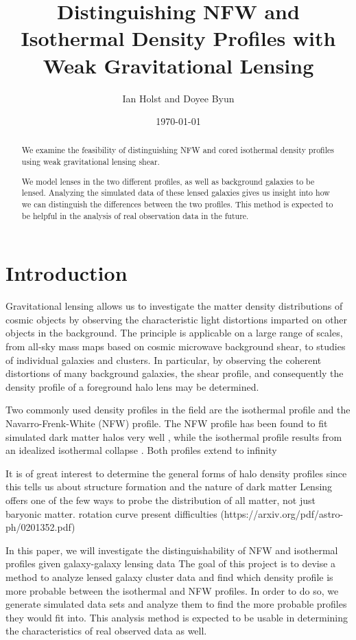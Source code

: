 \documentclass[10pt]{article}
\begin{document}
\title{Distinguishing NFW and Isothermal Density Profiles with Weak Gravitational Lensing}
\author{Ian Holst and Doyee Byun}
\date{\today}
\maketitle

\begin{abstract}
We examine the feasibility of distinguishing NFW and cored isothermal density profiles using weak gravitational lensing shear.

We model lenses in the two different profiles, as well as background galaxies to be lensed.
Analyzing the simulated data of these lensed galaxies gives us insight into how we can distinguish the differences between the two profiles.
This method is expected to be helpful in the analysis of real observation data in the future.
\end{abstract}


\section{Introduction}
Gravitational lensing allows us to investigate the matter density distributions of cosmic objects by observing the characteristic light distortions imparted on other objects in the background. The principle is applicable on a large range of scales, from all-sky mass maps based on cosmic microwave background shear, to studies of individual galaxies and clusters. In particular, by observing the coherent distortions of many background galaxies, the shear profile, and consequently the density profile of a foreground halo lens may be determined.

Two commonly used density profiles in the field are the isothermal profile and the Navarro-Frenk-White (NFW) profile. The NFW profile has been found to fit simulated dark matter halos very well \citep{}, while the isothermal profile results from an idealized isothermal collapse \citep{}. Both profiles extend to infinity

It is of great interest to determine the general forms of halo density profiles
since this tells us about structure formation and the nature of dark matter
\citep{}
Lensing offers one of the few ways to probe the distribution of all matter, not just baryonic matter.
rotation curve present difficulties (https://arxiv.org/pdf/astro-ph/0201352.pdf)

In this paper, we will investigate the distinguishability of NFW and isothermal profiles
given galaxy-galaxy lensing data
The goal of this project is to devise a method to analyze lensed galaxy cluster data and find which density profile is more probable between the isothermal and NFW profiles.
In order to do so, we generate simulated data sets and analyze them to find the more probable profiles they would fit into.
This analysis method is expected to be usable in determining the characteristics of real observed data as well.
\end{document}
